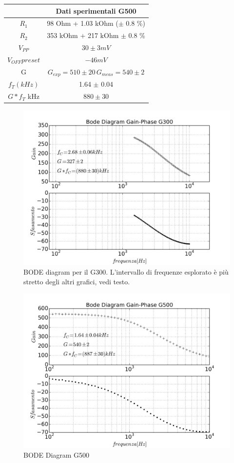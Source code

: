 \documentclass[journal, a4paper]{IEEEtran}
\begin{document}
{
\centering
\begin{tabular}{|c|c|}
\hline  &  \textbf{Dati sperimentali G500} \\ 
\hline $R_1$  &  98 \si{Ohm} + 1.03 \si{kOhm} ($\pm$ 0.8 \%) \\ 
\hline $R_2$ & 353 \si{kOhm} + 217  \si{kOhm} $\pm$ 0.8 \%  \\ 
\hline $V_{PP}$ & $ 30  \pm 3 \si{mV} $ \\ 
\hline $V_{OFF} preset$ & $ -46  \si{mV} $ \\
\hline G &  $G_{exp}  = 510 \pm 20  \, G_{meas} = 540 \pm 2 $ \\ 
\hline $f_T (kHz)$ &  1.64 $\pm$ 0.04 \\
\hline $G*f_{T}$ \si{kHz} & $ 880 \pm 30 $\\
\hline
\end{tabular} 

}


\begin{figure}
\centering
\includegraphics[width=0.9\linewidth]{./es_9_bode_g300}
\caption{BODE diagram per il G300. L'intervallo di frequenze esplorato è più stretto degli altri grafici, vedi testo.}
\label{fig:es_9_bode_g300}
\end{figure}


\begin{figure}
\centering
\includegraphics[width=0.9\linewidth]{./es_9_bode_g500}
\caption{BODE Diagram G500}
\label{fig:es_9_bode_g500}
\end{figure}
\end{document}
